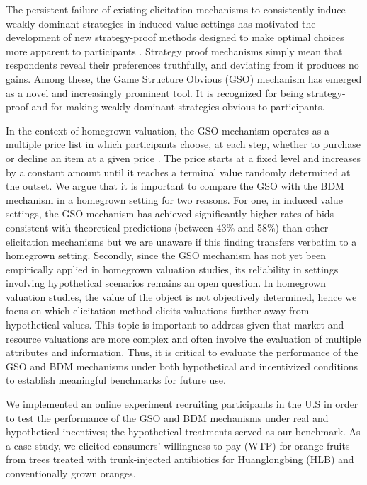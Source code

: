 \documentclass[12pt]{article}
\begin{document}
The persistent failure of existing elicitation mechanisms to consistently induce weakly dominant strategies in induced value settings has motivated the development of new strategy-proof methods designed to make optimal choices more apparent to participants \citep{li_obviously_2017, pycia_theory_2023}. Strategy proof mechanisms simply mean that respondents reveal their preferences truthfully, and deviating from it produces no gains. Among these, the Game Structure Obvious (GSO) mechanism has emerged as a novel and increasingly prominent tool. It is recognized for being strategy-proof and for making weakly dominant strategies obvious to participants. 

In the context of homegrown valuation, the GSO mechanism operates as a multiple price list in which participants choose, at each step, whether to purchase or decline an item at a given price \citep{yu2021multiple, herberich2012digging, jack2022multiple}.  The price starts at a fixed level and increases by a constant amount until it reaches a terminal value randomly determined at the outset. We argue that it is important to compare the GSO with the BDM mechanism in a homegrown setting for two reasons. For one, in induced value settings, the GSO mechanism has achieved significantly higher rates of bids consistent with theoretical predictions (between 43\% and 58\%) than other elicitation mechanisms but we are unaware if this finding transfers verbatim to a homegrown setting. Secondly, since the GSO mechanism has not yet been empirically applied in homegrown valuation studies, its reliability in settings involving hypothetical scenarios remains an open question. In homegrown valuation studies, the value of the object is not objectively determined, hence we focus on which elicitation method elicits valuations further away from hypothetical values.  This topic is important to address given that market and resource valuations are more complex and often involve the evaluation of multiple attributes and information.  Thus, it is critical to evaluate the performance of the GSO and BDM mechanisms under both hypothetical and incentivized conditions to establish meaningful benchmarks for future use. 

We implemented an online experiment recruiting participants in the U.S in order to test the performance of the GSO and BDM mechanisms under real and hypothetical incentives; the hypothetical treatments served as our benchmark. As a case study, we elicited consumers' willingness to pay (WTP) for orange fruits from trees treated with trunk-injected antibiotics for Huanglongbing (HLB) and conventionally grown oranges.
\end{document}
